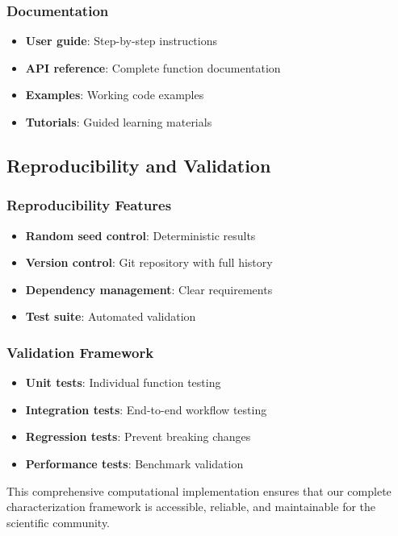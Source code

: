 \subsubsection{Documentation}
\begin{itemize}
    \item \textbf{User guide}: Step-by-step instructions
    \item \textbf{API reference}: Complete function documentation
    \item \textbf{Examples}: Working code examples
    \item \textbf{Tutorials}: Guided learning materials
\end{itemize}

\subsection{Reproducibility and Validation}

\subsubsection{Reproducibility Features}
\begin{itemize}
    \item \textbf{Random seed control}: Deterministic results
    \item \textbf{Version control}: Git repository with full history
    \item \textbf{Dependency management}: Clear requirements
    \item \textbf{Test suite}: Automated validation
\end{itemize}

\subsubsection{Validation Framework}
\begin{itemize}
    \item \textbf{Unit tests}: Individual function testing
    \item \textbf{Integration tests}: End-to-end workflow testing
    \item \textbf{Regression tests}: Prevent breaking changes
    \item \textbf{Performance tests}: Benchmark validation
\end{itemize}

This comprehensive computational implementation ensures that our complete characterization framework is accessible, reliable, and maintainable for the scientific community.
